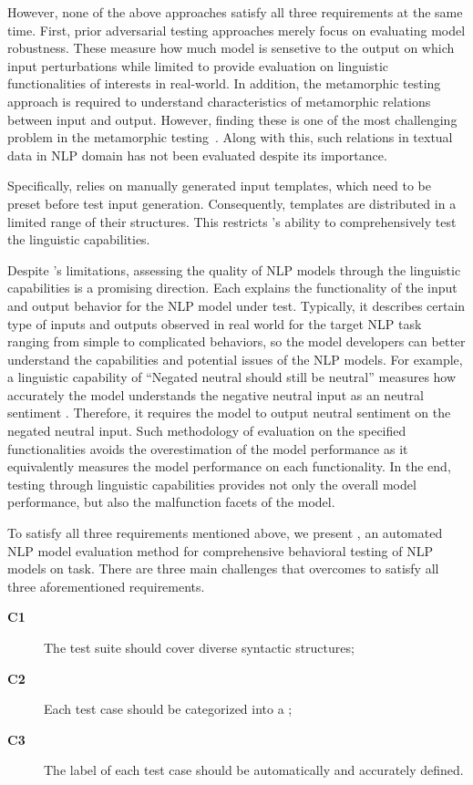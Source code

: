 However, none of the above approaches satisfy all three requirements
at the same time. First, prior adversarial testing approaches merely
focus on evaluating model robustness. These measure how much model is
sensetive to the output on which input perturbations while limited to
provide evaluation on linguistic functionalities of interests in
real-world. In addition, the metamorphic testing approach is required
to understand characteristics of metamorphic relations between input
and output.  However, finding these is one of the most challenging
problem in the metamorphic
testing~\cite{segura2016metamorphictest}. Along with this, such
relations in textual data in NLP domain has not been evaluated despite
its importance.  

Specifically, \Cklst relies on manually generated input templates,
which need to be preset before test input generation. Consequently,
\Cklst templates are distributed in a limited range of their
structures. This restricts \Cklst's ability to comprehensively test
the linguistic capabilities.

Despite \Cklst's limitations, assessing the quality of NLP models
through the linguistic capabilities is a promising direction. Each \lc
explains the functionality of the input and output behavior for the
NLP model under test. Typically, it describes certain type of inputs
and outputs observed in real world for the target NLP task ranging
from simple to complicated behaviors, so the model developers can
better understand the capabilities and potential issues of the NLP
models. For example, a linguistic capability of ``Negated neutral
should still be neutral'' measures how accurately the \sa model
understands the negative neutral input as an neutral sentiment
\cite{marcoACL2020checklist}.  Therefore, it requires the \sa model to
output neutral sentiment on the negated neutral input.  Such
methodology of evaluation on the specified functionalities avoids the
overestimation of the model performance as it equivalently measures
the model performance on each functionality.
In the end, testing through linguistic capabilities provides not only
the overall model performance, but also the malfunction facets of the
model.

To satisfy all three requirements mentioned above, we present \tool,
an automated NLP model evaluation method for comprehensive behavioral
testing of NLP models on \sa task.  There are three main challenges
that \tool overcomes to satisfy all three aforementioned requirements.
\begin{description}
\item[{\bf C1}] The test suite should cover diverse syntactic structures;
\item[{\bf C2}] Each test case should be categorized into a \lc;
\item[{\bf C3}] The label of each test case should be automatically
  and accurately defined.
\end{description}


